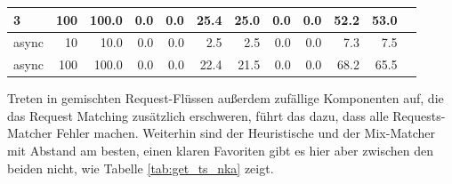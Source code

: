 \documentclass[12pt,a4paper]{report}
\begin{document}
\begin{table}[H]
\begin{tabular}{|l|r|r|r|r|r|r|r|r|r|r|r|}
		3                        & 100                                & 100.0                           & 0.0                         & 0.0                       & 25.4                           & 25.0 & 0.0 & 0.0 & 52.2 & 53.0 \\ \hline
		async                    & 10                                 & 10.0                            & 0.0                         & 0.0                       & 2.5                            & 2.5  & 0.0 & 0.0 & 7.3  & 7.5  \\ \hline
		async                    & 100                                & 100.0                           & 0.0                         & 0.0                       & 22.4                           & 21.5 & 0.0 & 0.0 & 68.2 & 65.5 \\ \hline
	\end{tabular}
\end{table}

Treten in gemischten Request-Flüssen außerdem zufällige Komponenten auf, die das Request Matching zusätzlich erschweren, führt das
dazu, dass alle Requests-Matcher Fehler machen. Weiterhin sind der Heuristische und der Mix-Matcher mit Abstand am besten, einen
klaren Favoriten gibt es hier aber zwischen den beiden nicht, wie Tabelle \ref{tab:get_ts_nka} zeigt.
\end{document}
